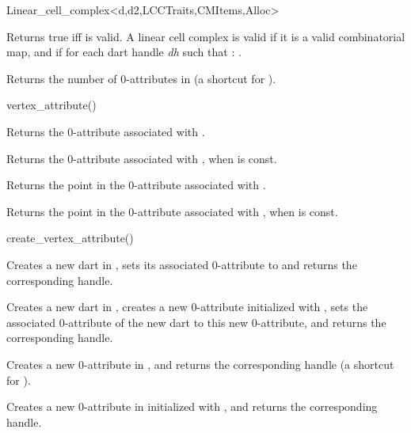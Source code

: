 \begin{ccRefClass}{Linear_cell_complex<d,d2,LCCTraits,CMItems,Alloc>}

         {Returns true iff  is valid.}
A linear cell complex  is valid  
if it is a valid combinatorial map, and if for each dart handle \emph{dh} such that 
\myin{}: .


{Returns the number of 0-attributes in 
       (a shortcut for ).}
 
{vertex_attribute()}{}

{Returns the 0-attribute associated with .}

{Returns the 0-attribute associated with , when  is const.}

{Returns the point in the 0-attribute associated with .}

{Returns the point in the 0-attribute associated with , 
 when  is const.}

{create_vertex_attribute()}{}

   {Creates a new dart in , sets its associated 0-attribute
     to  and returns the corresponding handle.
   }

{Creates a new dart in , creates a new 0-attribute 
  initialized with , sets the associated 0-attribute
  of the new dart to this new 0-attribute, 
  and returns the corresponding handle.}

{Creates a new 0-attribute in , and returns the corresponding handle
  (a shortcut for ).}

{Creates a new 0-attribute in  initialized with ,
  and returns the corresponding handle.}


\end{ccRefClass}
